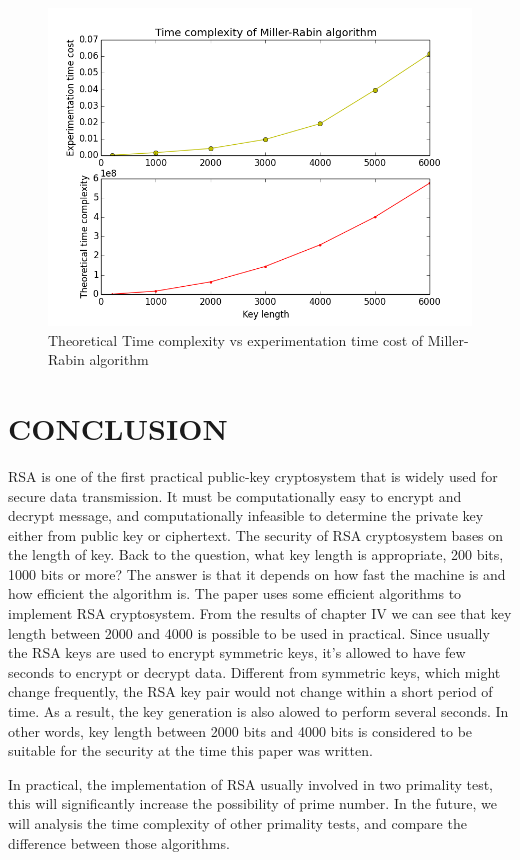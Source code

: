 \documentclass[12pt, oneside]{book}
\begin{document}
\begin{figure}
  \centering
  \includegraphics[scale=0.7]{rsa.png}
  \caption[]{Theoretical Time complexity vs experimentation time cost of Miller-Rabin algorithm}
  \label{fig:rsa}
\end{figure}

\chapter{\textbf{CONCLUSION}}
RSA is one of the first practical public-key cryptosystem that is widely used for secure data transmission. It must be computationally easy to encrypt and decrypt message, and computationally infeasible to determine the private key either from public key or ciphertext. The security of RSA cryptosystem bases on the length of key. Back to the question, what key length is appropriate, 200 bits, 1000 bits or more? The answer is that it depends on how fast the machine is and how efficient the algorithm is. The paper uses some efficient algorithms to implement RSA cryptosystem. From the results of chapter IV we can see that key length between 2000 and 4000 is possible to be used in practical. Since usually the RSA keys are used to encrypt symmetric keys, it's allowed to have few seconds to encrypt or decrypt data. Different from symmetric keys, which might change frequently, the RSA key pair would not change within a short period of time. As a result, the key generation is also alowed to perform several seconds. In other words, key length between 2000 bits and 4000 bits is considered to be suitable for the security at the time this paper was written.\par
In practical, the implementation of RSA usually involved in two primality test, this will significantly increase the possibility of prime number. In the future, we will analysis the time complexity of other primality tests, and compare the difference between those algorithms.
     




	

\clearpage
\markboth{}{}

\end{document}
